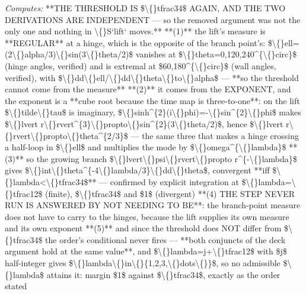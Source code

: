 \begin{description}
\emph{Computes:} **THE THRESHOLD IS \$\textbackslash\{\}tfrac34\$ AGAIN, AND THE TWO DERIVATIONS ARE INDEPENDENT --- so the removed argument was not the only one and nothing in \textbackslash\{\}S`lift` moves.**  **(1)** the lift's measure is **REGULAR** at a hinge, which is the opposite of the branch point's: \$\textbackslash\{\}ell=(2\textbackslash\{\}alpha/3)\textbackslash\{\}sin(3\textbackslash\{\}theta/2)\$ vanishes at \$\textbackslash\{\}theta=0,120,240\textasciicircum{}\{\textbackslash\{\}circ\}\$ (hinge angles, verified) and is extremal at \$60,180\textasciicircum{}\{\textbackslash\{\}circ\}\$ (wall angles, verified), with \$\textbackslash\{\}dd\textbackslash\{\}ell/\textbackslash\{\}dd\textbackslash\{\}theta\textbackslash\{\}to\textbackslash\{\}alpha\$ --- **so the threshold cannot come from the measure**  **(2)** it comes from the EXPONENT, and the exponent is a **cube root because the time map is three-to-one**: on the lift \$\textbackslash\{\}tilde\textbackslash\{\}tau\$ is imaginary, \$\textbackslash\{\}sinh\textasciicircum{}\{2\}(i\textbackslash\{\}phi)=-\textbackslash\{\}sin\textasciicircum{}\{2\}\textbackslash\{\}phi\$ makes \$\textbackslash\{\}lvert r\textbackslash\{\}rvert\textasciicircum{}\{3\}\textbackslash\{\}propto\textbackslash\{\}sin\textasciicircum{}\{2\}(3\textbackslash\{\}theta/2)\$, hence \$\textbackslash\{\}lvert r\textbackslash\{\}rvert\textbackslash\{\}propto\textbackslash\{\}theta\textasciicircum{}\{2/3\}\$ --- the same three that makes a hinge crossing a half-loop in \$\textbackslash\{\}ell\$ and multiplies the mode by \$\textbackslash\{\}omega\textasciicircum{}\{\textbackslash\{\}lambda\}\$  **(3)** so the growing branch \$\textbackslash\{\}lvert\textbackslash\{\}psi\textbackslash\{\}rvert\textbackslash\{\}propto r\textasciicircum{}\{-\textbackslash\{\}lambda\}\$ gives \$\textbackslash\{\}int\textbackslash\{\}theta\textasciicircum{}\{-4\textbackslash\{\}lambda/3\}\textbackslash\{\}dd\textbackslash\{\}theta\$, convergent **iff \$\textbackslash\{\}lambda<\textbackslash\{\}tfrac34\$** --- confirmed by explicit integration at \$\textbackslash\{\}lambda=\textbackslash\{\}tfrac12\$ (finite), \$\textbackslash\{\}tfrac34\$ and \$1\$ (divergent)  **(4) THE STEP NEVER RUN IS ANSWERED BY NOT NEEDING TO BE**: the branch-point measure does not have to carry to the hinges, because the lift supplies its own measure and its own exponent  **(5)** and since the threshold does NOT differ from \$\textbackslash\{\}tfrac34\$ the order's conditional never fires --- **both conjuncts of the deck argument hold at the same value**, and \$\textbackslash\{\}lambda=j+\textbackslash\{\}tfrac12\$ with \$j\$ half-integer gives \$\textbackslash\{\}lambda\textbackslash\{\}in\textbackslash\{\}\{1,2,3,\textbackslash\{\}dots\textbackslash\{\}\}\$, so no admissible \$\textbackslash\{\}lambda\$ attains it: margin \$1\$ against \$\textbackslash\{\}tfrac34\$, exactly as the order stated

\end{description}
